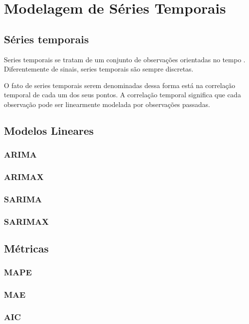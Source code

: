 \chapter{Modelagem de Séries Temporais}
\label{cap:series_temp}

\section{Séries temporais}


Series temporais se tratam de um conjunto de observações orientadas no tempo \cite{brockwell2002introduction}. Diferentemente de sinais, series temporais são sempre discretas.

O fato de series temporais serem denominadas dessa forma está na correlação temporal de cada um dos seus pontos. A correlação temporal significa que cada observação pode ser linearmente modelada por observações passadas. 

\section{Modelos Lineares}

\subsection{ARIMA}

\subsection{ARIMAX}

\subsection{SARIMA}

\subsection{SARIMAX}

\section{Métricas}

\subsection{MAPE}

\subsection{MAE}

\subsection{AIC}

%
%
